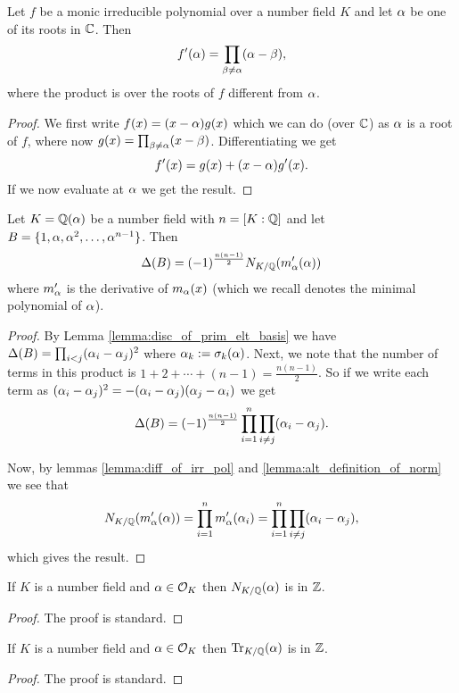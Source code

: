 \begin{lemma}\label{lemma:diff_of_irr_pol}
    \leanok
	Let $f$ be a monic irreducible polynomial over a number field $K$ and let $\alpha$ be one of its roots in $\mathbb{C}$. Then \[f'(\alpha)=\prod_{\beta \neq \alpha} (\alpha-\beta),  \] where the product is over the roots of $f$ different from $\alpha$.
\end{lemma}
\begin{proof}
    \leanok
	We first write $f(x)=(x-\alpha)g(x)$ which we can do (over $\mathbb{C}$) as $\alpha$ is a root of $f$, where now $g(x)=\prod_{\beta \neq \alpha} (x-\beta)$. Differentiating we get \[f'(x)=g(x)+(x-\alpha)g'(x).\] If we now evaluate at $\alpha$ we get the result.
\end{proof}

\begin{lemma}\label{lemma:num_field_disc_in_terms_of_norm}
	\leanok
	Let $K=\mathbb{Q}(\alpha)$ be a number field with $n=[K:\mathbb{Q}]$ and let $B=\{1,\alpha,\alpha^2,\dots,\alpha^{n-1}\}$. Then \[\Delta(B)=(-1)^{\frac{n(n-1)}{2}}N_{K/\mathbb{Q}}(m_\alpha'(\alpha))\] where $m_\alpha'$ is the derivative of $m_\alpha(x)$ (which we recall denotes the minimal polynomial of $\alpha$).
\end{lemma}
\begin{proof}
    \leanok
	By Lemma \ref{lemma:disc_of_prim_elt_basis} we have $\Delta(B)=\prod_{i < j}(\alpha_i-\alpha_j)^2$ where $\alpha_k:=\sigma_k(\alpha)$. Next, we note that the number of terms in this product is $1+2+\cdots+(n-1)=\frac{n(n-1)}{2}$. So if we write each term as $(\alpha_i-\alpha_j)^2=-(\alpha_i-\alpha_j)(\alpha_j-\alpha_i)$ we get \[\Delta(B)=(-1)^{\frac{n(n-1)}{2}}\prod_{i=1}^n \prod_{i \neq j} (\alpha_i-\alpha_j). \]

	Now, by lemmas \ref{lemma:diff_of_irr_pol} and \ref{lemma:alt_definition_of_norm} we see that \[N_{K/\mathbb{Q}}(m_\alpha'(\alpha))=\prod_{i=1}^n m_\alpha'(\alpha_i)=\prod_{i=1}^n \prod_{i \neq j} (\alpha_i-\alpha_j),\] which gives the result.
\end{proof}

\begin{lemma}\label{lemma:norm_of_alg_int_is_int}
	\leanok
	If $K$ is a number field and $\alpha \in \mathcal{O}_K$ then $N_{K/\mathbb{Q}}(\alpha)$ is in $\mathbb{Z}$.
\end{lemma}
\begin{proof}
  \leanok
  The proof is standard.
\end{proof}

\begin{lemma}\label{lemma:trace_of_alg_int_is_int}
	\leanok
	If $K$ is a number field and $\alpha \in \mathcal{O}_K$ then $\operatorname{Tr}_{K/\mathbb{Q}}(\alpha)$ is in $\mathbb{Z}$.
\end{lemma}
\begin{proof}
  \leanok
  The proof is standard.
\end{proof}

